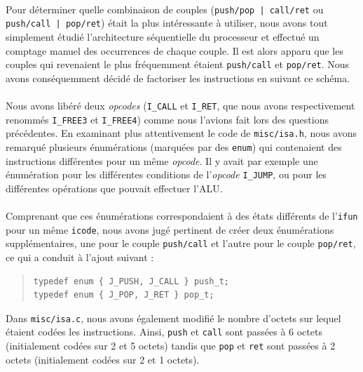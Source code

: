 \documentclass[12pt]{article}
\begin{document}
\paragraph{}Pour déterminer quelle combinaison de couples (\verb+push/pop | call/ret+ ou \verb+push/call | pop/ret+) était la plus intéressante à utiliser, nous avons tout simplement étudié l'architecture séquentielle du processeur et effectué un comptage manuel des occurrences de chaque couple. Il est alors apparu que les couples qui revenaient le plus fréquemment étaient \verb+push/call+ et \verb+pop/ret+. Nous avons conséquemment décidé de factoriser les instructions en suivant ce schéma.

\paragraph{}Nous avons libéré deux {\itshape opcodes} (\verb+I_CALL+ et \verb+I_RET+, que nous avons respectivement renommés \verb+I_FREE3+ et \verb+I_FREE4+) comme nous l'avions fait lors des questions précédentes. En examinant plus attentivement le code de \verb+misc/isa.h+, nous avons remarqué plusieurs énumérations (marquées par des \verb+enum+) qui contenaient des instructions différentes pour un même {\itshape opcode}. Il y avait par exemple une énumération pour les différentes conditions de l'{\itshape opcode} \verb+I_JUMP+, ou pour les différentes opérations que pouvait effectuer l'ALU. 

\paragraph{}Comprenant que ces énumérations correspondaient à des états différents de l'\verb+ifun+ pour un même \verb+icode+, nous avons jugé pertinent de créer deux énumérations supplémentaires, une pour le couple \verb+push/call+ et l'autre pour le couple \verb+pop/ret+, ce qui a conduit à l'ajout suivant :
\begin{quote}
\begin{verbatim}
typedef enum { J_PUSH, J_CALL } push_t;
typedef enum { J_POP, J_RET } pop_t;
\end{verbatim}
\end{quote}
Dans \verb+misc/isa.c+, nous avons également modifié le nombre d'octets sur lequel étaient codées les instructions. Ainsi, \verb+push+ et \verb+call+ sont passées à 6 octets (initialement codées sur 2 et 5 octets) tandis que \verb+pop+ et \verb+ret+ sont passées à 2 octets (initialement codées sur 2 et 1 octets).
\end{document}
